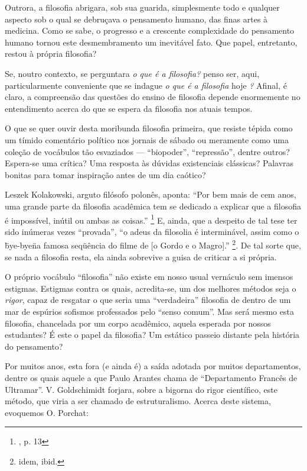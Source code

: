 \documentclass[12pt,a4paper]{article}
\begin{document}
	Outrora, a filosofia abrigara, sob sua guarida, simplesmente todo e 
	qualquer aspecto sob o qual se debruçava o pensamento humano, das 
	finas artes à medicina. Como se sabe, o progresso e a crescente 
	complexidade do pensamento humano tornou este desmembramento um 
	inevitável fato. Que papel, entretanto, restou à própria filosofia? 

	Se, noutro contexto, se perguntara \textit{o que é a filosofia?} 
	penso ser, aqui, particularmente conveniente que se indague 
	\textit{o que é a filosofia} hoje \textit{?} Afinal, é claro, 
	a compreensão das questões do ensino de filosofia depende 
	enormemente no entendimento acerca do que se espera da filosofia 
	nos atuais tempos. 

	O que se quer ouvir desta moribunda filosofia primeira, que 
	resiste tépida como um tímido comentário político nos jornais de 
	sábado ou meramente como uma coleção de vocábulos tão esvaziados 
	--- “biopoder”, “repressão”, dentre outros? Espera-se uma crítica? 
	Uma resposta às dúvidas existenciais clássicas? Palavras bonitas 
	para tomar inspiração antes de um dia caótico? 

	Leszek Kolakowski, arguto filósofo polonês, aponta: “Por bem mais 
	de cem anos, uma grande parte da filosofia acadêmica tem se 
	dedicado a explicar que a filosofia é impossível, inútil ou 
	ambas as coisas.” \footnote{\cite{lkmeta}, p. 13}
	E, ainda, que a despeito de tal tese ter sido 
	inúmeras vezes “provada”, “o adeus da filosolia é interminável, assim 
	como o \"bye-bye\" na famosa seqüência do filme de [o Gordo e o Magro].”
	\footnote{idem, ibid.}. De tal sorte que, se nada a filosofia 
	resta, ela ainda sobrevive a guisa de criticar a si própria. 

	O próprio vocábulo “filosofia” não existe em nosso usual vernáculo 
	sem imensos estigmas. Estigmas contra os quais, acredita-se, um 
	dos melhores métodos seja o \textit{rigor}, capaz de resgatar o que 
	seria uma “verdadeira” filosofia de dentro de um mar de espúrios 
	sofismos professados pelo “senso comum”. Mas será mesmo esta 
	filosofia, chancelada por um corpo acadêmico, aquela esperada 
	por nossos estudantes? É este o papel da filosofia? Um estático 
	passeio distante pela história do pensamento? 

	Por muitos anos, esta fora (e ainda é) a saída adotada por 
	muitos departamentos, dentre os quais aquele a que Paulo Arantes 
	chama de “Departamento Francês de Ultramar”. V. Goldschimidt 
	forjara, sobre a bigorna do rigor científico, este método, 
	que viria a ser chamado de estruturalismo. Acerca deste sistema, 
	evoquemos O. Porchat: 
\end{document}

